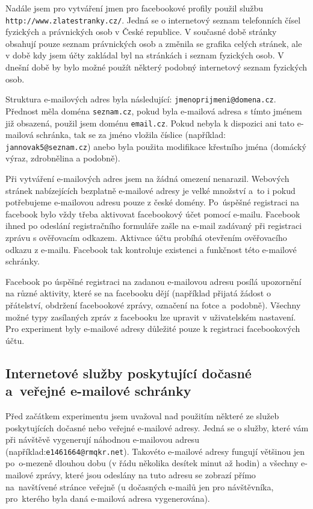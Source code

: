 \documentclass[thesis=M,czech]{FITthesis}[2013/05/10]
\begin{document}
Nadále jsem pro vytváření jmen pro facebookové profily použil službu \verb|http://www.zlatestranky.cz/|. Jedná se o internetový seznam telefonních čísel fyzických a právnických osob v České republice. V současné době stránky obsahují pouze seznam právnických osob a změnila se grafika celých stránek, ale v době kdy jsem účty zakládal byl na stránkách i seznam fyzických osob. V dnešní době by bylo možné použít některý podobný internetový seznam fyzických osob.

Struktura e-mailových adres byla následující: \verb|jmenoprijmeni@domena.cz|. Přednost měla doména \verb|seznam.cz|, pokud byla e-mailová adresa s tímto jménem již obsazená, použil jsem doménu \verb|email.cz|. Pokud nebyla k dispozici ani tato e-mailová schránka, tak se za jméno vložila číslice (například: \verb|jannovak5@seznam.cz|) anebo byla použita modifikace křestního jména (domácký výraz, zdrobnělina a podobně).

Při vytváření e-mailových adres jsem na žádná omezení nenarazil. Webových stránek nabízejících bezplatně e-mailové adresy je velké množství a~to i pokud potřebujeme e-mailovou adresu pouze z české domény. Po~úspěšné registraci na facebook bylo vždy třeba aktivovat facebookový účet pomocí e-mailu. Facebook ihned po odeslání registračního formuláře zašle na e-mail zadávaný při registraci zprávu s ověřovacím odkazem. Aktivace účtu probíhá otevřením ověřovacího odkazu z e-mailu. Facebook tak kontroluje existenci a funkčnost této e-mailové schránky.

Facebook po úspěšné registraci na zadanou e-mailovou adresu posílá upozornění na různé aktivity, které se na facebooku dějí (například přijatá žádost o přátelství, obdržení facebookové zprávy, označení na fotce a~podobně). Všechny možné typy zasílaných zpráv z facebooku lze upravit v uživatelském nastavení. Pro experiment byly e-mailové adresy důležité pouze k registraci facebookových účtu.

\subsection{Internetové služby poskytující dočasné a~veřejné e-mailové schránky}

Před začátkem experimentu jsem uvažoval nad použitím některé ze služeb poskytujících dočasné nebo veřejné e-mailové adresy. Jedná se o služby, které vám při návštěvě vygenerují náhodnou e-mailovou adresu (například:\newline \verb|e1461664@rmqkr.net|). Takovéto e-mailové adresy fungují většinou jen po~o-mezeně dlouhou dobu (v řádu několika desítek minut až hodin) a všechny e-mailové zprávy, které jsou odeslány na tuto adresu se zobrazí přímo na~navštívené stránce veřejně (u dočasných e-mailů jen pro návštěvníka, pro~kterého byla daná e-mailová adresa vygenerována).
\end{document}
